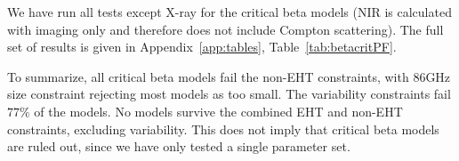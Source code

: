 We have run all tests except X-ray for the critical beta models (NIR is calculated with imaging only and therefore does not include Compton scattering).  The full set of results is given in Appendix~\ref{app:tables}, Table~\ref{tab:betacritPF}.

To summarize, all critical beta models fail the non-EHT constraints, with 86GHz size constraint rejecting most models as too small.  The variability constraints fail $77\%$ of the models.  No models survive the combined EHT and non-EHT constraints, excluding variability.  This does not imply that critical beta models are ruled out, since we have only tested a single parameter set.




